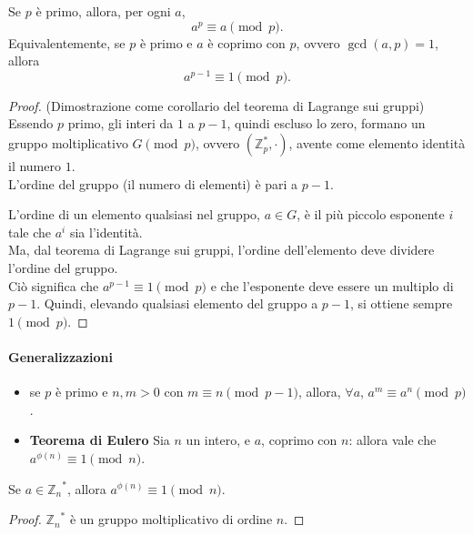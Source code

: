 \begin{theorem}
\label{thm:fermat}
Se $p$ è primo, allora, per ogni $a$, 
\[
    a^p \equiv a \pmod p.
    \]
    Equivalentemente, se $p$ è primo e $a$ è coprimo con $p$, ovvero $\gcd (a,p)=1$, allora 
    \[a^{p-1} \equiv 1 \pmod p.
    \] 
    
\end{theorem}
\begin{proof} (Dimostrazione come corollario del teorema di Lagrange sui gruppi)\\
    Essendo $p$ primo, gli interi da $1$ a $p-1$, quindi escluso lo zero, formano un gruppo moltiplicativo $G \pmod p$, ovvero $(\mathbb{Z}_p^*, \cdot)$, avente come elemento identità il numero $1$. \\ L'ordine del gruppo (il numero di elementi) è pari a $p-1$.
    
    \vspace{1em} L'ordine di un elemento qualsiasi nel gruppo, $a \in G$, è il più piccolo esponente $i$ tale che $a^i$ sia l'identità. \\ Ma, dal teorema di Lagrange sui gruppi, l'ordine dell'elemento deve dividere l'ordine del gruppo. \\ Ciò significa che $a^{p-1} \equiv 1 \pmod p$ e che l'esponente deve essere un multiplo di $p-1$. Quindi, elevando qualsiasi elemento del gruppo a $p-1$, si ottiene sempre $1 \pmod p$. 
\end{proof}

\paragraph{Generalizzazioni}
\begin{itemize}
    \item se $p$ è primo e $n,m >0$ con $m \equiv n \pmod {p-1}$, allora, $\forall a$, $a^m \equiv a^n \pmod p$.
    \item \textbf{Teorema di Eulero} Sia $n$ un intero, e $a$, coprimo con $n$: allora vale che $a^{\phi(n)} \equiv 1 \pmod n$.
\end{itemize}

\begin{corollary}
    Se $a \in {\mathbb{Z}_n}^*$, allora $a^{\phi(n)} \equiv 1 \pmod n$. \label{Corollario1}
\end{corollary}

\begin{proof}
    ${\mathbb{Z}_n}^*$ è un gruppo moltiplicativo di ordine $n$.
\end{proof}

